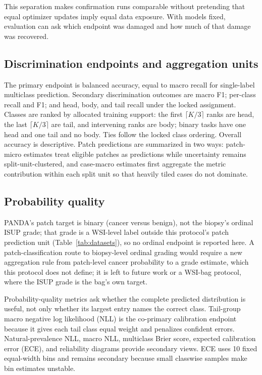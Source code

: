 \documentclass[11pt]{article}
\begin{document}
This separation makes confirmation runs comparable without pretending that equal optimizer updates imply equal data exposure. With models fixed, evaluation can ask which endpoint was damaged and how much of that damage was recovered.

\subsection{Discrimination endpoints and aggregation units}
The primary endpoint is balanced accuracy, equal to macro recall for single-label multiclass prediction. Secondary discrimination outcomes are macro F1; per-class recall and F1; and head, body, and tail recall under the locked assignment. Classes are ranked by allocated training support: the first $\lceil K/3\rceil$ ranks are head, the last $\lceil K/3\rceil$ are tail, and intervening ranks are body; binary tasks have one head and one tail and no body. Ties follow the locked class ordering. Overall accuracy is descriptive. Patch predictions are summarized in two ways: patch-micro estimates treat eligible patches as predictions while uncertainty remains split-unit-clustered, and case-macro estimates first aggregate the metric contribution within each split unit so that heavily tiled cases do not dominate.

\subsection{Probability quality}
PANDA's patch target is binary (cancer versus benign), not the biopsy's ordinal ISUP grade; that grade is a WSI-level label outside this protocol's patch prediction unit (Table~\ref{tab:datasets}), so no ordinal endpoint is reported here. A patch-classification route to biopsy-level ordinal grading would require a new aggregation rule from patch-level cancer probability to a grade estimate, which this protocol does not define; it is left to future work or a WSI-bag protocol, where the ISUP grade is the bag's own target.

Probability-quality metrics ask whether the complete predicted distribution is useful, not only whether its largest entry names the correct class. Tail-group macro negative log likelihood (NLL) is the co-primary calibration endpoint because it gives each tail class equal weight and penalizes confident errors. Natural-prevalence NLL, macro NLL, multiclass Brier score, expected calibration error (ECE), and reliability diagrams provide secondary views. ECE uses 10 fixed equal-width bins and remains secondary because small classwise samples make bin estimates unstable.
\end{document}
